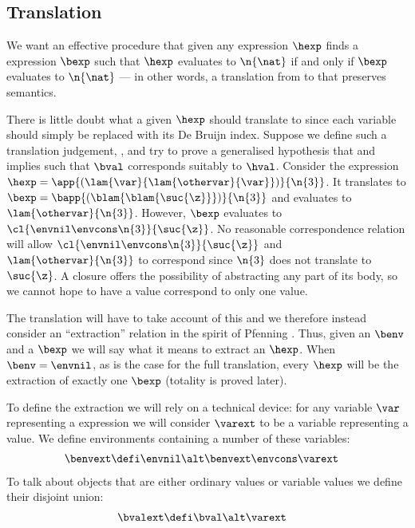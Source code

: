 \subsection{Translation}
We want an effective procedure that given any \hlang expression $\hexp$ finds a \blang expression $\bexp$ such that $\hexp$ evaluates to $\n{\nat}$ if and only if $\bexp$ evaluates to $\n{\nat}$ --- in other words, a translation from \hlang to \blang that preserves semantics.

There is little doubt what a given $\hexp$ should translate to since each variable should simply be replaced with its De Bruijn index.
Suppose we define such a translation judgement, \trahbfaux{\hexp}{\bexp}, and try to prove a generalised hypothesis that \trahbfaux{\hexp}{\bexp} and \hev{\hexp}{\hval} implies \bev{\benv}{\bexp}{\bval} such that $\bval$ corresponds suitably to $\hval$.
Consider the expression $\hexp = \app{(\lam{\var}{\lam{\othervar}{\var}})}{\n{3}}$.
It translates to $\bexp = \bapp{(\blam{\blam{\suc{\z}}})}{\n{3}}$ and evaluates to $\lam{\othervar}{\n{3}}$.
However, $\bexp$ evaluates to $\cl{\envnil \envcons \n{3}}{\suc{\z}}$.
No reasonable correspondence relation will allow $\cl{\envnil \envcons \n{3}}{\suc{\z}}$ and $\lam{\othervar}{\n{3}}$ to correspond since $\n{3}$ does not translate to $\suc{\z}$.
A closure offers the possibility of abstracting any part of its body, so we cannot hope to have a \hlang value correspond to only one \blang value.

The translation will have to take account of this and we therefore instead consider an ``extraction'' relation in the spirit of Pfenning \cite[p. 150]{Pfenning01}.
Thus, given an $\benv$ and a $\bexp$ we will say what it means to extract an $\hexp$.
When $\benv = \envnil$, as is the case for the full translation, every $\hexp$ will be the extraction of exactly one $\bexp$ (totality is proved later).

To define the extraction we will rely on a technical device: for any variable $\var$ representing a \hlang expression we will consider $\varext$ to be a variable representing a \blang value.
We define environments containing a number of these variables:
\begin{align*}
  \benvext &\defi \envnil \alt \benvext \envcons \varext
\end{align*}
To talk about objects that are either ordinary values or variable values we define their disjoint union:
\begin{align*}
  \bvalext &\defi \bval \alt \varext
\end{align*}

